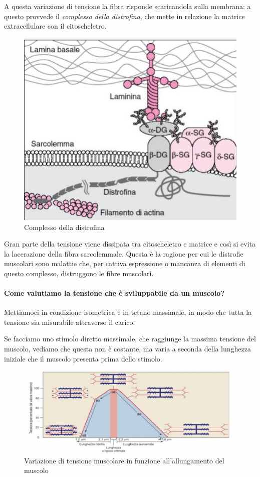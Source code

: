 \documentclass[a4paper,12pt]{article}
\begin{document}
A questa variazione di tensione la fibra risponde scaricandola sulla membrana: a questo provvede il \emph{complesso della distrofina}, che mette in relazione la matrice extracellulare con il citoscheletro. 
\begin{figure}[H]
\centering
\includegraphics[scale=0.4]{immagine/distrofina.jpg}
\caption{Complesso della distrofina}
\end{figure}

Gran parte della tensione viene dissipata tra citoscheletro e matrice e così si evita la lacerazione della fibra sarcolemmale. Questa è la ragione per cui le distrofie muscolari sono malattie che, per cattiva espressione o mancanza di elementi di questo complesso, distruggono le fibre muscolari.

\paragraph{Come valutiamo la tensione che è sviluppabile da un muscolo?}
Mettiamoci in condizione isometrica e in tetano massimale, in modo che tutta la tensione sia misurabile attraverso il carico.

Se facciamo uno stimolo diretto massimale, che raggiunge la massima tensione del muscolo, vediamo che questa non è costante, ma varia a seconda della lunghezza iniziale che il muscolo presenta prima dello stimolo.
\begin{figure}[H]
\centering
\includegraphics[scale=0.4]{immagine/var_ten.jpg}
\caption{Variazione di tensione muscolare in funzione all'allungamento del muscolo}
\end{figure}
\end{document}
